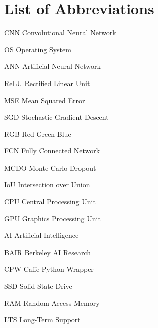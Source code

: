 \chapter*{List of Abbreviations}
\symbolsize=3.5cm%
\vspace{7mm}
\begin{symboly}

\item[CNN] Convolutional Neural Network
\item[OS] Operating System
\item[ANN] Artificial Neural Network
\item[ReLU] Rectified Linear Unit
\item[MSE] Mean Squared Error
\item[SGD] Stochastic Gradient Descent
\item[RGB] Red-Green-Blue
\item[FCN] Fully Connected Network
\item[MCDO] Monte Carlo Dropout
\item[IoU] Intersection over Union
\item[CPU] Central Processing Unit
\item[GPU] Graphics Processing Unit
\item[AI] Artificial Intelligence
\item[BAIR] Berkeley AI Research
\item[CPW] Caffe Python Wrapper
\item[SSD] Solid-State Drive
\item[RAM] Random-Access Memory
\item[LTS] Long-Term Support

\end{symboly}
